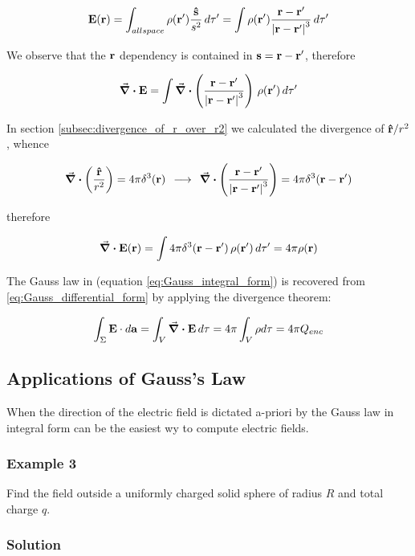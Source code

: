 \begin{equation}
\vb{E}(\vb{r}) = \int_{all space} \rho(\vb{r}') \frac{\vu{s}}{s^2} \,d\tau' = \int \rho(\vb{r}') \frac{\vb{r} - \vb{r}'}{\abs{\vb{r} - \vb{r}'}^3} \,d\tau'
\end{equation}

We observe that the $\vb{r}$ dependency is contained in $\vb{s} = \vb{r} - \vb{r}'$, therefore 

$$\div{\vb{E}} = \int \div{ \left( \frac{\vb{r} - \vb{r}'}{\abs{\vb{r} - \vb{r}'}^3} \right)}\, \rho(\vb{r}') \,d\tau'$$   

In section \ref{subsec:divergence_of_r_over_r2} we calculated the divergence of $\vu{r}/r^2$, whence

$$\div{\left({\frac{\vu{r}}{r^2}}\right)} = 4\pi \delta^3(\vb{r}) \:\: \longrightarrow \:\: \div{ \left( \frac{\vb{r} - \vb{r}'}{\abs{\vb{r} - \vb{r}'}^3} \right)} = 4\pi \delta^3(\vb{r} - \vb{r}')$$

therefore 

\begin{equation}
\label{eq:Gauss_differential_form}
\div{\vb{E}(\vb{r})} = \int 4\pi \delta^3(\vb{r} - \vb{r}') \, \rho(\vb{r}') \,d\tau' = 4 \pi \rho(\vb{r})   
\end{equation}


The Gauss law in  (equation \ref{eq:Gauss_integral_form}) is recovered from \ref{eq:Gauss_differential_form} by applying the divergence theorem:

\begin{equation*}
\int_{\Sigma} \vb{E} \cdot d\vb{a} = \int_V  \div{\vb{E}} \, d\tau = 4 \pi \int_V \rho d\tau = 4\pi Q_{enc} 
\end{equation*}

\subsection{Applications of Gauss's Law}
When the direction of the electric field is dictated a-priori by  the Gauss law in integral form can be the easiest wy to compute electric fields. 

\subsubsection*{Example 3}
Find the field outside a uniformly charged solid sphere of radius $R$ and total charge $q$.  

\subsubsection*{Solution}

